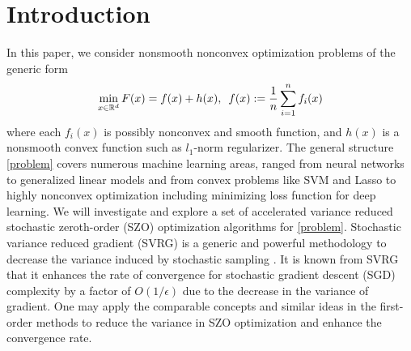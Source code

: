 \section{Introduction}
In this paper, we consider nonsmooth nonconvex optimization problems of the generic form
\begin{equation}\label{problem}
\min_{x\in\R^d} F(x) =  f(x) + h(x),\,\,\,f(x):=\frac{1}{n}\sum_{i=1}^n f_i(x)
\end{equation}
where each $f_i(x)$ is possibly nonconvex and smooth function, and $h(x)$ is a nonsmooth convex function such as $l_1$-norm regularizer. 
The general structure \eqref{problem} covers
numerous machine learning areas, ranged from neural networks to  generalized linear models  
 and from convex problems like  SVM  and Lasso to highly nonconvex optimization including minimizing loss function for deep learning. We will investigate and explore a set of accelerated variance reduced stochastic zeroth-order (SZO) optimization algorithms for \eqref{problem}. Stochastic variance reduced gradient
(SVRG) is a generic and powerful methodology to decrease the variance induced by stochastic sampling \cite{johnson2013accelerating,reddi2016stochastic,nitanda2016accelerated,allen2016improved,lei2017non}. It is known from SVRG that it enhances the rate of convergence for stochastic gradient descent (SGD) complexity by a factor of $O(1/{\epsilon})$ due to the decrease in the variance of gradient. One may apply the comparable concepts and similar ideas in the first-order methods to reduce the variance in SZO optimization and enhance the convergence rate. 

\iffalse
\subsection{Background in research}
In recent years, there has been significant studies for convex problems of the form \eqref{problem} (see e.g., \cite{nesterov2013gradient}, \cite{xiao2014proximal,defazio2014saga,lan2017optimal,allen2017katyusha}. 
In particular, in \cite{beck2009fast}, the authors designed a fast-converging class of proximal gradient (PG) schemes for problems with convex structure based on Nesterov's momentum acceleration.  
\cite{xiao2014proximal} developed an algorithm called Prox-SVRG for large-scale problems with a 
linear convergence rate when each  $f_i$ is strongly-convex. To deal with large-scale convex problems, several stochastic PG methods are developed in \cite{bertsekas2011incremental,xiao2014proximal}. Due to the growing applications of deep neural networks, recently the studies for nonconvex problems have been noticeably increasing. Nevertheless, for the generic nonsmooth nonconvex problems the analysis is still rather sparse.  \cite{li2015accelerated} introduced a set of fast-converging PG algorithms for nonconvex structure problems. In the similar spirit, \cite{ghadimi2016accelerated,reddi2016proximal} studied stochastic PG methods for nonconvex optimization.
Recently, \cite{li2018simple} designed an algorithm by extending the results from \cite{reddi2016proximal}, implying an improved iteration complexity for stochastic gradient method. 
\fi

